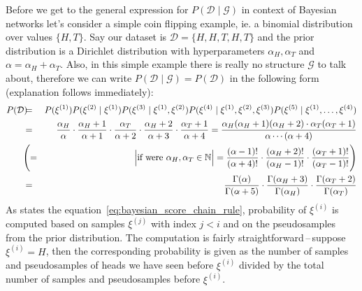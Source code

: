 \documentclass[english,cover]{fitthesis} %
\begin{document}
Before we get to the general expression for $P(\mathcal{D} \mid \mathcal{G})$ in context of Bayesian networks let's consider a simple coin flipping example, ie. a binomial distribution over values $\lbrace H, T \rbrace$. Say our dataset is $\mathcal{D} = \lbrace H,H,T,H,T\rbrace$ and the prior distribution is a Dirichlet distribution with hyperparameters $\alpha_H, \alpha_T$ and $\alpha = \alpha_H + \alpha_T$. Also, in this simple example there is really no structure $\mathcal{G}$ to talk about, therefore we can write $P(\mathcal{D} \mid \mathcal{G}) = P(\mathcal{D})$ in the following form (explanation follows immediately):
\begin{eqnarray*}
    P(\mathcal{D})
     & \!\!\! = & \! P(\xi^{(1)})
           P(\xi^{(2)} \mid \xi^{(1)})
           P(\xi^{(3)} \mid \xi^{(1)},\xi^{(2)})
           P(\xi^{(4)} \mid \xi^{(1)},\xi^{(2)},\xi^{(3)})
           P(\xi^{(5)} \mid \xi^{(1)},\dots,\xi^{(4)}) \\
     & \!\!\! = & \! \frac{\alpha_H}{\alpha} \cdot
           \frac{\alpha_H + 1}{\alpha + 1} \cdot
           \frac{\alpha_T}{\alpha + 2} \cdot
           \frac{\alpha_H + 2}{\alpha + 3} \cdot
           \frac{\alpha_T + 1}{\alpha + 4}
       =   \frac{\alpha_H (\alpha_H + 1) (\alpha_H + 2) \cdot \alpha_T (\alpha_T + 1)}{\alpha \dotsm (\alpha + 4)}\\
     & \!\!\! \Biggl( = & \! \Bigl \lvert \text{if were } \alpha_H, \alpha_T \in \mathbb{N} \Bigr \rvert = \frac{(\alpha - 1)!}{(\alpha + 4)!} \cdot \frac{(\alpha_H + 2)!}{(\alpha_H - 1)!} \cdot \frac{(\alpha_T + 1)!}{(\alpha_T - 1)!} \Biggr) \\
     & \!\!\! = & \! \frac{\Gamma(\alpha)}{\Gamma(\alpha + 5)} \cdot \frac{\Gamma(\alpha_H + 3)}{\Gamma(\alpha_H)} \cdot \frac{\Gamma(\alpha_T + 2)}{\Gamma(\alpha_T)}
\end{eqnarray*}
As states the equation~\eqref{eq:bayesian_score_chain_rule}, probability of $\xi^{(i)}$ is computed based on samples $\xi^{(j)}$ with index $j < i$ and on the pseudosamples from the prior distribution. The computation is fairly straightforward\,--\,suppose $\xi^{(i)} = H$, then the corresponding probability is given as the number of samples and pseudosamples of heads we have seen before $\xi^{(i)}$ divided by the total number of samples and pseudosamples before $\xi^{(i)}$.
\end{document}
